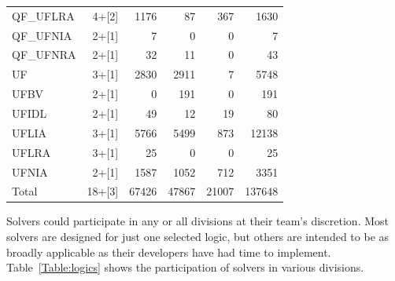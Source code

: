 \documentclass[twoside,11pt]{article}
\begin{document}
\begin{table}
\begin{tabular}{|l|r|r|r|r|r|}
QF\_UFLRA & 4+[2] & 1176 & 87 & 367 & 1630 \\
QF\_UFNIA & 2+[1] & 7 & 0 &0 & 7 \\
QF\_UFNRA & 2+[1] & 32 & 11 & 0 & 43\\
UF & 3+[1] & 2830 & 2911 & 7 & 5748 \\
UFBV & 2+[1] & 0 & 191 & 0 & 191 \\
UFIDL & 2+[1] & 49 & 12 & 19 & 80 \\
UFLIA & 3+[1] & 5766 & 5499 & 873 & 12138 \\
UFLRA & 3+[1] & 25 & 0 & 0 & 25\\
UFNIA & 2+[1] & 1587 & 1052 & 712 & 3351 \\
\hline
Total & 18+[3] & 67426 & 47867 & 21007 & 137648 \\
\hline
\end{tabular}
\end{table}

Solvers could participate in any or all divisions at their team's discretion. Most solvers are designed for just one selected logic, but others are intended to be as broadly applicable as their developers have had time to implement. Table~\ref{Table:logics} shows the participation of solvers in various divisions.
\end{document}
